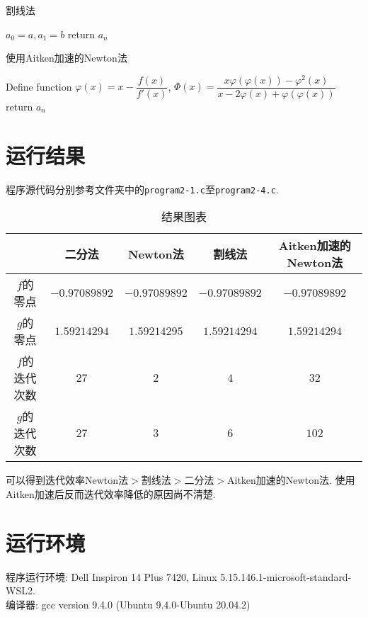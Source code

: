 \documentclass{ctexart}
\begin{document}
\begin{algorithm}[H]
    \caption{割线法}
    $a_0=a,a_1=b$\;
    return $a_n$\;
\end{algorithm}

\begin{algorithm}[H]
    \caption{使用Aitken加速的Newton法}
    Define function $\varphi(x)=x-\dfrac{f(x)}{f'(x)}$, $\Phi(x)=\dfrac{x\varphi(\varphi(x))-\varphi^2(x)}{x-2\varphi(x)+\varphi(\varphi(x))}$\;
    return $a_n$\;
\end{algorithm}

\section{运行结果}
程序源代码分别参考文件夹中的\verb|program2-1.c|至\verb|program2-4.c|.
\begin{table}[H]
    \begin{tabular}{|c|c|c|c|c|}
    \hline
     & 二分法 & Newton法 & 割线法 & Aitken加速的Newton法 \\ \hline
    $f$的零点 & $-0.97089892$ & $-0.97089892$ & $-0.97089892$ & $-0.97089892$ \\ \hline
    $g$的零点 & $1.59214294$ & $1.59214295$ & $1.59214294$ & $1.59214294$ \\ \hline
    $f$的迭代次数 & $27$ & $2$ & $4$ & $32$ \\ \hline
    $g$的迭代次数 & $27$ & $3$ & $6$ & $102$ \\ \hline
    \end{tabular}
    \caption{结果图表}
\end{table}

可以得到迭代效率Newton法$>$割线法$>$二分法$>$Aitken加速的Newton法.
使用Aitken加速后反而迭代效率降低的原因尚不清楚.

\section{运行环境}
\noindent 程序运行环境: Dell Inspiron 14 Plus 7420, Linux 5.15.146.1-microsoft-standard-WSL2.\\
编译器: gcc version 9.4.0 (Ubuntu 9.4.0-Ubuntu 20.04.2)
\end{document}
